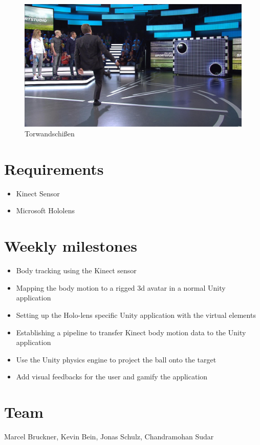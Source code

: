 \documentclass[a4paper,pagesize 10pt]{scrartcl}
\begin{document}
\begin{figure}[h]
	\centering
	\includegraphics[width=0.7\linewidth]{torwandschiessen.jpeg}
	\caption{Torwandschißen}
	\label{fig:overview}
\end{figure}

\section{Requirements}
\begin{itemize}	
	\item Kinect Sensor
  \item Microsoft Hololens
\end{itemize}

\section{Weekly milestones}
\begin{itemize}	
  \item Body tracking using the Kinect sensor
  \item Mapping the body motion to a rigged 3d avatar in a normal Unity application
  \item Setting up the Holo-lens specific Unity application with the virtual elements
  \item Establishing a pipeline to transfer Kinect body motion data to the Unity application
  \item Use the Unity physics engine to project the ball onto the target
  \item Add visual feedbacks for the user and gamify the application
\end{itemize}


\section{Team}
Marcel Bruckner, Kevin Bein, Jonas Schulz, Chandramohan Sudar

{\small
	
	
}
\end{document}
